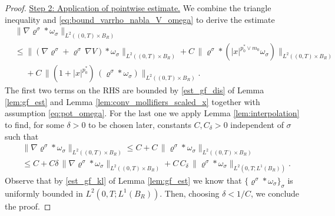 \documentclass[reqno, 11pt]{amsart}
\numberwithin{equation}{section}
\theoremstyle{definition}
\begin{document}
\begin{proof}
    \underline{Step 2: Application of pointwise estimate.} We combine the triangle inequality and \eqref{eq:bound_varrho_nabla_V_omega} to derive the estimate
    \begin{align*}
        &\| \nabla \varrho^\sigma \ast \omega_\sigma  \|_{L^2((0,T)\times B_R)}\\ &\leq \| (\nabla \varrho^\sigma + \varrho^\sigma\, \nabla V)\ast\omega_\sigma \|_{L^2((0,T)\times B_R)}
        +C\,\| \varrho^\sigma \ast (|x|^{p_0^\ast\vee m_0}\omega_\sigma)  \|_{L^2((0,T)\times B_R)}  \\
        &\phantom{\leq}+ C\,\| (1+|x|^{p_0^\ast})\,(\varrho^\sigma\ast\omega_\sigma) \|_{L^2((0,T)\times B_R)}.
    \end{align*}
    The first two terms on the RHS are bounded by \ref{est_gf_dis} of Lemma \ref{lem:gf_est} and Lemma \ref{lem:conv_mollifiers_scaled_x} together with assumption \eqref{eq:pot_omega}. For the last one we apply Lemma \ref{lem:interpolation} to find, for some $\delta>0$ to be chosen later, constants $C,C_\delta>0$ independent of $\sigma$ such that
    \begin{align*}
        &\| \nabla \varrho^\sigma \ast \omega_\sigma  \|_{L^2((0,T)\times B_R)}
        \leq C+C\,\| \varrho^\sigma \ast \omega_\sigma  \|_{L^2((0,T)\times B_R)}\\
        &\leq C+C \delta\,\| \nabla\varrho^\sigma \ast \omega_\sigma  \|_{L^2((0,T)\times B_R)}
        +C\,C_\delta\, \| \varrho^\sigma \ast \omega_\sigma  \|_{L^2(0,T;L^1( B_R))}.
    \end{align*}
    Observe that by \ref{est_gf_kl} of Lemma \ref{lem:gf_est} we know that $\{\varrho^\sigma \ast \omega_\sigma\}_\sigma$ is uniformly bounded in $L^2(0,T;L^1( B_R))$. Then, choosing $\delta<1/C$, we conclude the proof.
\end{proof}
\end{document}
